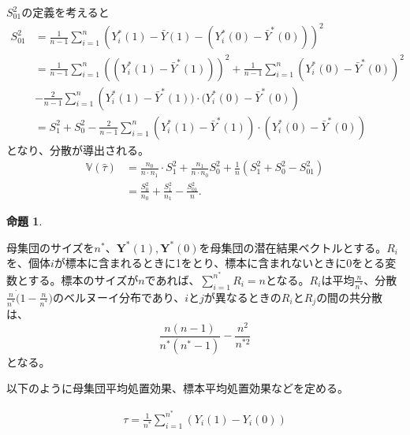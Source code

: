 \documentclass[a4paper]{bxjsarticle}
\newtheorem{prop}{命題}
\begin{document}
$S_{01}^2$の定義を考えると
\begin{equation}
\begin{split}
S_{01}^2 &=\frac{1}{n-1} \sum_{i=1}^n \left(Y_i^\ast(1)-\bar{Y}(1)-\left(Y_i^\ast(0) - \bar{Y}^\ast(0)\right) \right)^2 \\
&=\frac{1}{n-1} \sum_{i=1}^n\left((Y_i^\ast(1)-\bar{Y}^\ast(1))\right)^2 + \frac{1}{n-1}\sum_{i=1}^n\left(Y_i^\ast(0) -\bar{Y}^\ast(0)\right)^2\\
&-\frac{2}{n-1}\sum_{i=1}^n \left(Y_i^\ast(1)-\bar{Y}^\ast(1)\big) \cdot \big(Y_i^\ast(0)-\bar{Y}^\ast(0)\right) \\
&=S_1^2 + S_0^2 - \frac{2}{n-1} \sum_{i=1}^n(Y_i^\ast(1)-\bar{Y}^\ast(1))\cdot \left(Y_i^\ast(0)-\bar{Y}^\ast(0)\right)
\end{split}
\end{equation}
となり、分散が導出される。
\begin{equation}
\begin{split}
\mathbb{V}(\hat{\tau}) &=
\frac{n_0}{n \cdot n_1} \cdot S_1^2 + \frac{n_1}{n \cdot n_0}S_0^2 + \frac{1}{n} \left(S_1^2 + S_0^2-S_{01}^2 \right) \\
&=\frac{S_{0}^2}{n_0} + \frac{S_{1}^2}{n_1} - \frac{S_{01}^2}{n}. 
\end{split}
\end{equation}

\begin{prop}
\end{prop}


母集団のサイズを$n^\ast$、$\mathbf{Y}^\ast(1), \mathbf{Y}^\ast(0)$を母集団の潜在結果ベクトルとする。$R_i$を、個体$i$が標本に含まれるときに1をとり、標本に含まれないときに0をとる変数とする。標本のサイズが$n$であれば、$\sum_{i = 1}^{n^\ast} R_i = n$となる。$R_i$は平均$\frac{n}{n^\ast}$、分散$\frac{n}{n^\ast} \dot (1 - \frac{n}{n^\ast})$のベルヌーイ分布であり、$i$と$j$が異なるときの$R_i$と$R_j$の間の共分散は、
\begin{equation}
\frac{n(n-1)}{n^\ast (n^\ast - 1)} - \frac{n^2}{n^{\ast2}}
\end{equation}
となる。

以下のように母集団平均処置効果、標本平均処置効果などを定める。

\begin{equation}
\begin{split}
\tau = \frac{1}{n^{\ast}} \sum_{i=1}^{n^{\ast}} (Y_i(1) - Y_i(0))
\end{split}
\end{equation} 
\end{document}
